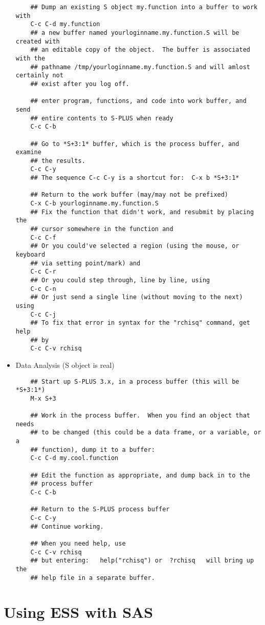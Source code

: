 \documentclass{article}
\begin{document}
\begin{itemize}
\begin{verbatim}
    ## Dump an existing S object my.function into a buffer to work with
    C-c C-d my.function
    ## a new buffer named yourloginname.my.function.S will be created with
    ## an editable copy of the object.  The buffer is associated with the
    ## pathname /tmp/yourloginname.my.function.S and will amlost certainly not
    ## exist after you log off.

    ## enter program, functions, and code into work buffer, and send
    ## entire contents to S-PLUS when ready
    C-c C-b

    ## Go to *S+3:1* buffer, which is the process buffer, and examine
    ## the results.
    C-c C-y
    ## The sequence C-c C-y is a shortcut for:  C-x b *S+3:1*

    ## Return to the work buffer (may/may not be prefixed)
    C-x C-b yourloginname.my.function.S
    ## Fix the function that didn't work, and resubmit by placing the
    ## cursor somewhere in the function and
    C-c C-f
    ## Or you could've selected a region (using the mouse, or keyboard 
    ## via setting point/mark) and 
    C-c C-r
    ## Or you could step through, line by line, using 
    C-c C-n
    ## Or just send a single line (without moving to the next) using
    C-c C-j
    ## To fix that error in syntax for the "rchisq" command, get help
    ## by
    C-c C-v rchisq
\end{verbatim}
\item Data Analysis (S object is real)
\begin{verbatim}
    ## Start up S-PLUS 3.x, in a process buffer (this will be *S+3:1*) 
    M-x S+3

    ## Work in the process buffer.  When you find an object that needs 
    ## to be changed (this could be a data frame, or a variable, or a 
    ## function), dump it to a buffer:
    C-c C-d my.cool.function

    ## Edit the function as appropriate, and dump back in to the
    ## process buffer  
    C-c C-b

    ## Return to the S-PLUS process buffer
    C-c C-y
    ## Continue working.

    ## When you need help, use 
    C-c C-v rchisq
    ## but entering:   help("rchisq") or  ?rchisq   will bring up the
    ## help file in a separate buffer.
\end{verbatim}
\end{itemize}


\section{Using ESS with SAS}
\label{sec:SAS}
\end{document}
